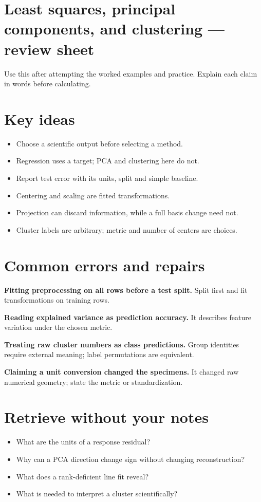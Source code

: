 \documentclass[11pt,letterpaper]{article}
\theoremstyle{definition}\newtheorem{definition}{Definition}\newtheorem{example}{Example}
\numberwithin{equation}{section}
\begin{document}
\section*{Least squares, principal components, and clustering --- review sheet}
Use this after attempting the worked examples and practice. Explain each claim in words before calculating.

\section*{Key ideas}
\begin{itemize}
\item Choose a scientific output before selecting a method.
\item Regression uses a target; PCA and clustering here do not.
\item Report test error with its units, split and simple baseline.
\item Centering and scaling are fitted transformations.
\item Projection can discard information, while a full basis change need not.
\item Cluster labels are arbitrary; metric and number of centers are choices.
\end{itemize}
\section*{Common errors and repairs}
\textbf{Fitting preprocessing on all rows before a test split.} Split first and fit transformations on training rows.

\textbf{Reading explained variance as prediction accuracy.} It describes feature variation under the chosen metric.

\textbf{Treating raw cluster numbers as class predictions.} Group identities require external meaning; label permutations are equivalent.

\textbf{Claiming a unit conversion changed the specimens.} It changed raw numerical geometry; state the metric or standardization.

\section*{Retrieve without your notes}
\begin{itemize}
\item What are the units of a response residual?
\item Why can a PCA direction change sign without changing reconstruction?
\item What does a rank-deficient line fit reveal?
\item What is needed to interpret a cluster scientifically?
\end{itemize}
\end{document}
